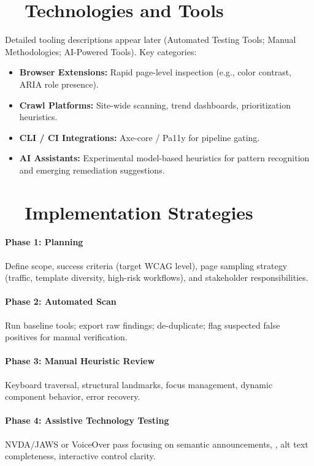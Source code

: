 \section{~~Technologies and Tools}\label{sec:technologies-tools-auditing}
Detailed tooling descriptions appear later (Automated Testing Tools; Manual Methodologies; AI-Powered Tools). Key categories:
\begin{itemize}
	\item \textbf{Browser Extensions:} Rapid page-level inspection (e.g., color contrast, ARIA role presence).
	\item \textbf{Crawl Platforms:} Site-wide scanning, trend dashboards, prioritization heuristics.
	\item \textbf{CLI / CI Integrations:} Axe-core / Pa11y for pipeline gating.
	\item \textbf{AI Assistants:} Experimental model-based heuristics for pattern recognition and emerging remediation suggestions.
\end{itemize}

\section{~~Implementation Strategies}\label{sec:implementation-strategies-auditing}
\paragraph{Phase 1: Planning} Define scope, success criteria (target WCAG level), page sampling strategy (traffic, template diversity, high-risk workflows), and stakeholder responsibilities.
\paragraph{Phase 2: Automated Scan} Run baseline tools; export raw findings; de-duplicate; flag suspected false positives for manual verification.
\paragraph{Phase 3: Manual Heuristic Review} Keyboard traversal, structural landmarks, focus management, dynamic component behavior, error recovery.
\paragraph{Phase 4: Assistive Technology Testing} NVDA/JAWS or VoiceOver pass focusing on semantic announcements, , alt text completeness, interactive control clarity.
